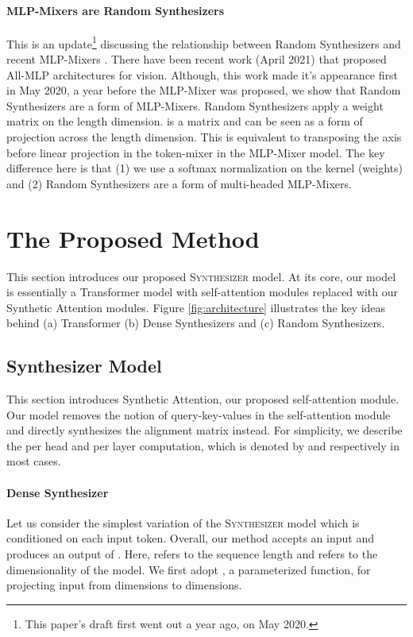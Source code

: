 \documentclass{article}
\begin{document}
\paragraph{MLP-Mixers are Random Synthesizers}
This is an update\footnote{This paper's draft first went out a year ago, on May 2020.} discussing the relationship between Random Synthesizers and recent MLP-Mixers \citep{tolstikhin2021mlp}. There have been recent work (April 2021) that proposed All-MLP architectures for vision. Although, this work made it's appearance first in May 2020, a year before the MLP-Mixer was proposed, we show that Random Synthesizers are a form of MLP-Mixers. Random Synthesizers apply a weight matrix  on the length dimension.  is a  matrix and can be seen as a form of projection across the length dimension. This is equivalent to transposing the axis before linear projection in the token-mixer in the MLP-Mixer model. The key difference here is that (1) we use a softmax normalization on the kernel (weights) and (2) Random Synthesizers are a form of multi-headed MLP-Mixers.

\section{The Proposed Method}
This section introduces our proposed \textsc{Synthesizer} model. At its core, our model is essentially a Transformer model with self-attention modules replaced with our Synthetic Attention modules. Figure \ref{fig:architecture} illustrates the key ideas behind (a) Transformer (b) Dense Synthesizers and (c) Random Synthesizers.

\subsection{Synthesizer Model}
This section introduces Synthetic Attention, our proposed self-attention module. Our model removes the notion of query-key-values in the self-attention module and directly synthesizes the alignment matrix instead. For simplicity, we describe the per head and per layer computation, which is denoted by  and  respectively in most cases.

\paragraph{Dense Synthesizer} Let us consider the simplest variation of the \textsc{Synthesizer} model which is conditioned on each input token. Overall, our method accepts an input  and produces an output of . Here,  refers to the sequence length and  refers to the dimensionality of the model. We first adopt , a parameterized function, for projecting input  from  dimensions to  dimensions.
\end{document}
